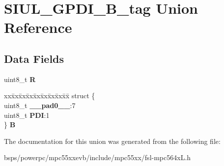 \hypertarget{unionSIUL__GPDI__8B__tag}{}\section{S\+I\+U\+L\+\_\+\+G\+P\+D\+I\+\_\+B\+\_\+tag Union Reference}
\label{unionSIUL__GPDI__8B__tag}
\subsection*{Data Fields}
\begin{DoxyCompactItemize}
\item 
\mbox{\label{unionSIUL__GPDI__8B__tag_a8a488c4cf04b671ebc2e975d2989902a}} 
uint8\+\_\+t {\bfseries R}
\item 
\mbox{\label{unionSIUL__GPDI__8B__tag_af55ada10c62d7fd135aaae184167f5d4}} 
\begin{tabbing}
xx\=xx\=xx\=xx\=xx\=xx\=xx\=xx\=xx\=\kill
struct \{\\
\>uint8\_t {\bfseries \_\_pad0\_\_}:7\\
\>uint8\_t {\bfseries PDI}:1\\
\} {\bfseries B}\\

\end{tabbing}\end{DoxyCompactItemize}


The documentation for this union was generated from the following file\+:\begin{DoxyCompactItemize}
\item 
bsps/powerpc/mpc55xxevb/include/mpc55xx/fsl-\/mpc564x\+L.\+h\end{DoxyCompactItemize}
